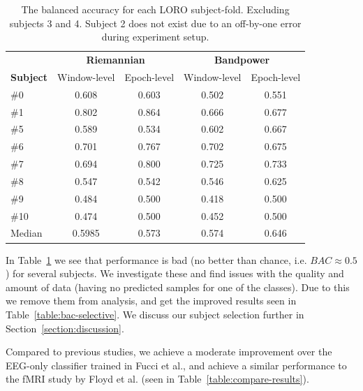         \begin{table}[h]
            \centering
            \begin{tabular}{lcccc}
                \toprule
                & \multicolumn{2}{c}{\textbf{Riemannian}} & \multicolumn{2}{c}{\textbf{Bandpower}} \\
                \cmidrule(lr){2-3}
                \cmidrule(lr){4-5}
                \textbf{Subject} & Window-level & Epoch-level & Window-level & Epoch-level \\
                \midrule
                \#0  & 0.608 & 0.603 & 0.502 & 0.551 \\
                \#1  & 0.802 & 0.864 & 0.666 & 0.677 \\
                \#5  & 0.589 & 0.534 & 0.602 & 0.667 \\
                \#6  & 0.701 & 0.767 & 0.702 & 0.675 \\
                \#7  & 0.694 & 0.800 & 0.725 & 0.733 \\
                \#8  & 0.547 & 0.542 & 0.546 & 0.625 \\
                \#9  & 0.484 & 0.500 & 0.418 & 0.500 \\
                \#10 & 0.474 & 0.500 & 0.452 & 0.500 \\
                \midrule
                Median & 0.5985 & 0.573 & 0.574 & 0.646 \\
                \bottomrule
            \end{tabular}
            \caption{The balanced accuracy for each LORO subject-fold. Excluding subjects 3 and 4. Subject 2 does not exist due to an off-by-one error during experiment setup.}\label{table:bac-all}
        \end{table}

        In Table~\ref{table:bac-all} we see that performance is bad (no better than chance, i.e. $BAC \approx 0.5$) for several subjects. We investigate these and find issues with the quality and amount of data (having no predicted samples for one of the classes). Due to this we remove them from analysis, and get the improved results seen in Table~\ref{table:bac-selective}. We discuss our subject selection further in Section~\ref{section:discussion}.

        Compared to previous studies, we achieve a moderate improvement over the EEG-only classifier trained in Fucci et al., and achieve a similar performance to the fMRI study by Floyd et al. (seen in Table~\ref{table:compare-results}).

